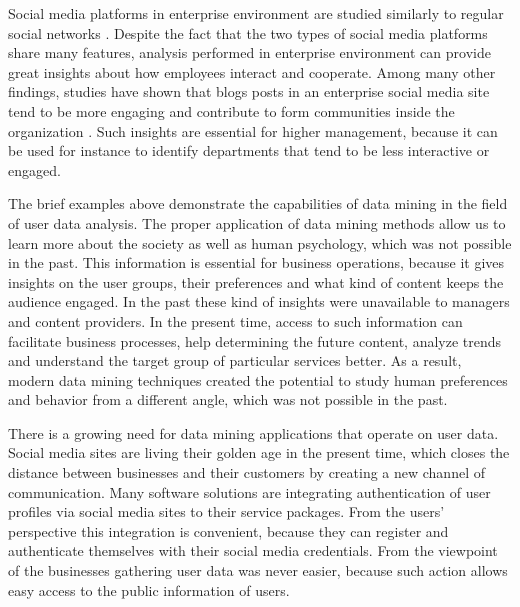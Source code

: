     Social media platforms in enterprise environment are studied similarly to regular social networks \cite{guy2016whatsyourorganizationlike}. Despite the fact that the two types of social media platforms share many features, analysis performed in enterprise environment can provide great insights about how employees interact and cooperate. Among many other findings, studies have shown that blogs posts in an enterprise social media site tend to be more engaging and contribute to form communities inside the organization \cite{guy2016whatsyourorganizationlike}. Such insights are essential for higher management, because it can be used for instance to identify departments that tend to be less interactive or engaged.  


    The brief examples above demonstrate the capabilities of data mining in the field of user data analysis. The proper application of data mining methods allow us to learn more about the society as well as human psychology, which was not possible in the past. This information is essential for business operations, because it gives insights on the user groups, their preferences and what kind of content keeps the audience engaged. In the past these kind of insights were unavailable to managers and content providers. In the present time, access to such information can facilitate business processes, help determining the future content, analyze trends and understand the target group of particular services better. As a result, modern data mining techniques created the potential to study human preferences and behavior from a different angle, which was not possible in the past. 

    There is a growing need for data mining applications that operate on user data. Social media sites are living their golden age in the present time, which closes the distance between businesses and their customers by creating a new channel of communication. Many software solutions are integrating authentication of user profiles via social media sites to their service packages. From the users' perspective this integration is convenient, because they can register and authenticate themselves with their social media credentials. From the viewpoint of the businesses gathering user data was never easier, because such action allows easy access to the public information of users. 

